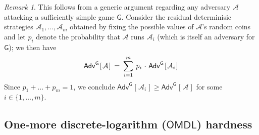 \documentclass[10pt, psamsfonts, reqno]{amsart}
\theoremstyle{definition}
\theoremstyle{remark}
\newtheorem{rem}[thm]{Remark}
\numberwithin{equation}{section}
\begin{document}
\begin{rem}
\noindent
This follows from a generic argument
regarding any adversary $\mathcal{A}$
attacking a sufficiently simple game $\mathsf{G}$.
Consider the residual determinisic strategies
$\mathcal{A}_1, \dots, \mathcal{A}_m$ obtained
by fixing the possible values of $\mathcal{A}$'s
random coins and let $p_i$ denote the probability that
$\mathcal{A}$ runs $\mathcal{A}_i$
(which is itself an adversary for $\mathsf{G}$);
we then have
\vspace{5pt}
\begin{equation*}
	\mathsf{Adv}
		^{\mathsf{G}}
		\hspace{1pt}
		[
			\hspace{1pt}
			\mathcal{A}
			\hspace{1pt}
		]
	\hspace{2pt}
	=
	\hspace{2pt}
	\sum_{i=1}^m
	\hspace{2pt}
	p_i
	\hspace{1pt}
	\cdot
	\hspace{1pt}
	\mathsf{Adv}
		^{\mathsf{G}}
		\hspace{1pt}
		[
			\hspace{1pt}
			\mathcal{A}_i
			\hspace{1pt}
		]\hspace{1pt}
\vspace{5pt}
\end{equation*}
Since $p_1 + \dots + p_m = 1$, we conclude
$
\mathsf{Adv}
	^{\mathsf{G}}
	\hspace{1pt}
	[
		\hspace{1pt}
		\mathcal{A}_i
		\hspace{1pt}
	]
\ge
\mathsf{Adv}
	^{\mathsf{G}}
	\hspace{1pt}
	[
		\hspace{1pt}
		\mathcal{A}
		\hspace{1pt}
	]
$
for some $i \in \{1, \dots, m\}$.
\end{rem}

\subsection{One-more discrete-logarithm ($\mathsf{OMDL}$) hardness}\label{section_omdl_hardness}
\end{document}
